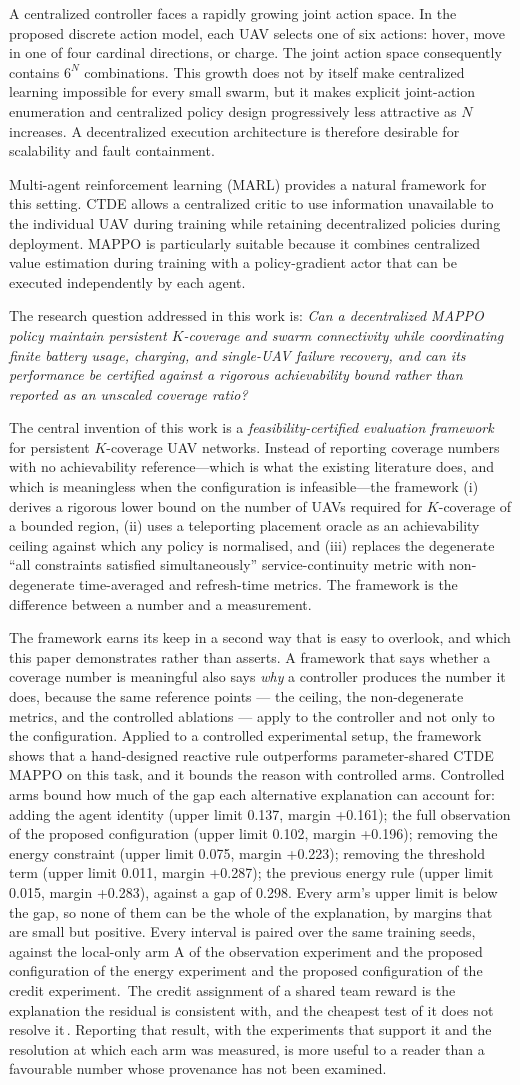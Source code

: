 \documentclass[conference]{IEEEtran}
\newcommand{\tokArmsSummarySentence}{Controlled arms bound how much of the gap each alternative explanation can account for: adding the agent identity (upper limit 0.137, margin +0.161); the full observation of the proposed configuration (upper limit 0.102, margin +0.196); removing the energy constraint (upper limit 0.075, margin +0.223); removing the threshold term (upper limit 0.011, margin +0.287); the previous energy rule (upper limit 0.015, margin +0.283), against a gap of 0.298.  Every arm's upper limit is below the gap, so none of them can be the whole of the explanation, by margins that are small but positive.  Every interval is paired over the same training seeds, against the local-only arm A of the observation experiment and the proposed configuration of the energy experiment and the proposed configuration of the credit experiment.}
\newcommand{\tokCreditResidualShort}{The credit assignment of a shared team reward is the explanation the residual is consistent with, and the cheapest test of it does not resolve it}
\begin{document}
A centralized controller faces a rapidly growing joint action space. In the proposed discrete action model, each UAV selects one of six actions: hover, move in one of four cardinal directions, or charge. The joint action space consequently contains $6^N$ combinations. This growth does not by itself make centralized learning impossible for every small swarm, but it makes explicit joint-action enumeration and centralized policy design progressively less attractive as $N$ increases. A decentralized execution architecture is therefore desirable for scalability and fault containment.

Multi-agent reinforcement learning (MARL) provides a natural framework for this setting. CTDE allows a centralized critic to use information unavailable to the individual UAV during training while retaining decentralized policies during deployment. MAPPO is particularly suitable because it combines centralized value estimation during training with a policy-gradient actor that can be executed independently by each agent.

The research question addressed in this work is: \emph{Can a decentralized MAPPO policy maintain persistent $K$-coverage and swarm connectivity while coordinating finite battery usage, charging, and single-UAV failure recovery, and can its performance be certified against a rigorous achievability bound rather than reported as an unscaled coverage ratio?}

The central invention of this work is a \emph{feasibility-certified evaluation framework} for persistent $K$-coverage UAV networks.  Instead of reporting coverage numbers with no achievability reference---which is what the existing literature does, and which is meaningless when the configuration is infeasible---the framework (i) derives a rigorous lower bound on the number of UAVs required for $K$-coverage of a bounded region, (ii) uses a teleporting placement oracle as an achievability ceiling against which any policy is normalised, and (iii) replaces the degenerate ``all constraints satisfied simultaneously'' service-continuity metric with non-degenerate time-averaged and refresh-time metrics.  The framework is the difference between a number and a measurement.

The framework earns its keep in a second way that is easy to overlook, and which this paper demonstrates rather than asserts.  A framework that says whether a coverage number is meaningful also says \emph{why} a controller produces the number it does, because the same reference points --- the ceiling, the non-degenerate metrics, and the controlled ablations --- apply to the controller and not only to the configuration.  Applied to a controlled experimental setup, the framework shows that a hand-designed reactive rule outperforms parameter-shared CTDE MAPPO on this task, and it bounds the reason with controlled arms.  \tokArmsSummarySentence\ \tokCreditResidualShort\,.  Reporting that result, with the experiments that support it and the resolution at which each arm was measured, is more useful to a reader than a favourable number whose provenance has not been examined.
\end{document}
